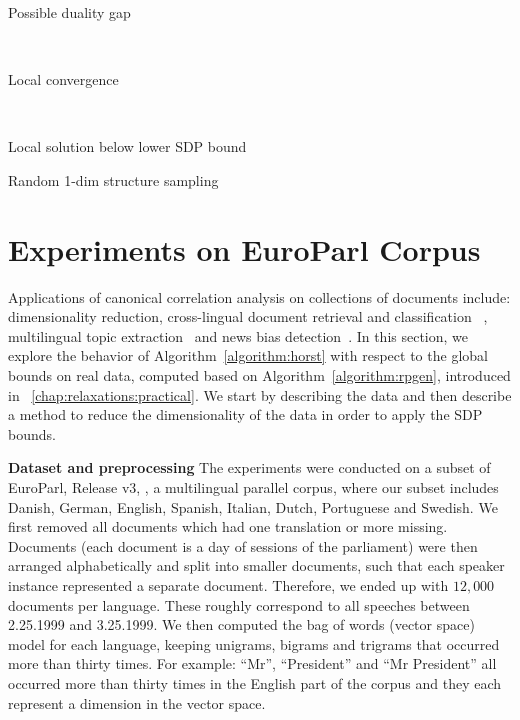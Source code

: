 \begin{table}[t]
    \begin{subtable}[t]{.5\textwidth}
        \centering
        
        \caption{Possible duality gap}
        \label{tb:r1d_dg}
    \end{subtable}
    ~
    \begin{subtable}[t]{.5\textwidth}
        \centering
        
        \caption{Local convergence}
        \label{tb:r1d_lc}
    \end{subtable}
    ~
    \begin{subtable}[t]{\textwidth}
        \centering
        
        \caption{Local solution below lower SDP bound}
        \label{tb:r1d_lb}
    \end{subtable}
  \caption{Random 1-dim structure sampling}
  \label{tb:r1d}
\end{table}

\section{Experiments on EuroParl Corpus}\label{subsec:documents}

Applications of canonical correlation analysis on collections of
documents include: dimensionality reduction, cross-lingual document retrieval and classification~
\cite{ccatext, ccatextdva}, multilingual topic extraction~\cite{mcca} and news bias detection~\cite{ccanewsbias}. 
In this section, we explore the behavior of
Algorithm~\ref{algorithm:horst} with respect to the global
bounds on real data, computed based on Algorithm~\ref{algorithm:rpgen}, 
introduced in ~\ref{chap:relaxations:practical}. 
We start by describing the data and then describe a method to
reduce the dimensionality of the data in order to apply the SDP
bounds.

\noindent\textbf{Dataset and preprocessing}
The experiments were conducted on a subset of EuroParl, Release v3,
\cite{europarl}, a multilingual parallel corpus, where our subset
includes Danish, German, English, Spanish, Italian, Dutch,
Portuguese and Swedish. We first removed all documents
which had one translation or more missing. Documents (each
document is a day of sessions of the parliament) were then
arranged alphabetically and split into smaller documents, such that
each speaker instance represented a separate document.
Therefore, we ended up with $12,000$ documents per
language. These roughly correspond to all speeches between 2.25.1999
and 3.25.1999. We then computed the bag of words (vector space)
\cite{Salton88term-weightingapproaches} model for each language,
keeping unigrams, bigrams and trigrams that occurred
more than thirty times. For example: ``Mr'', ``President'' and
``Mr President'' all occurred more than thirty times in the
English part of the corpus and they each represent a dimension in
the vector space.

